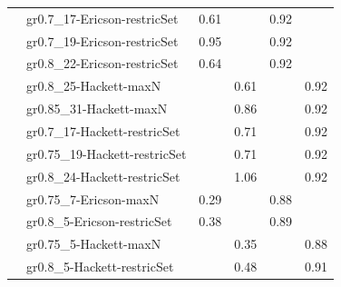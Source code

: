\begin{footnotesize}
\begin{longtable}{@{}ll|rr|rr@{}}
 & gr0.7\_17-Ericson-restricSet & 0.61 &      & 0.92 &     \\
 & gr0.7\_19-Ericson-restricSet & 0.95 &      & 0.92 &     \\
 & gr0.8\_22-Ericson-restricSet & 0.64 &      & 0.92 &     \\
 & gr0.8\_25-Hackett-maxN &      & 0.61 &      & 0.92\\
 & gr0.85\_31-Hackett-maxN &      & 0.86 &      & 0.92\\
 & gr0.7\_17-Hackett-restricSet &      & 0.71 &      & 0.92\\
 & gr0.75\_19-Hackett-restricSet &      & 0.71 &      & 0.92\\
 & gr0.8\_24-Hackett-restricSet &      & 1.06 &      & 0.92\\
\addlinespace
\multirow{4}{*}{PEP} & gr0.75\_7-Ericson-maxN & 0.29 &      & 0.88 &     \\
 & gr0.8\_5-Ericson-restricSet & 0.38 &      & 0.89 &     \\
 & gr0.75\_5-Hackett-maxN &      & 0.35 &      & 0.88\\
 & gr0.8\_5-Hackett-restricSet &      & 0.48 &      & 0.91\\
\bottomrule
\end{longtable}
\end{footnotesize}
\clearpage%


